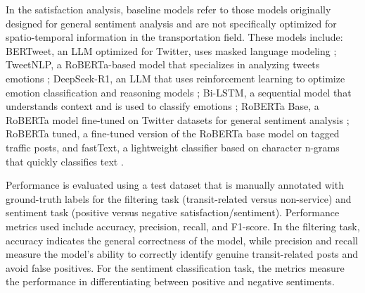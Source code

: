 \documentclass[a4paper,fleqn,12pt]{cas-sc}
\begin{document}
In the satisfaction analysis, baseline models refer to those models originally designed for general sentiment analysis and are not specifically optimized for spatio-temporal information in the transportation field. These models include: BERTweet, an LLM optimized for Twitter, uses masked language modeling \citep{nguyen2020bertweet}; TweetNLP, a RoBERTa-based model that specializes in analyzing tweets emotions \citep{camacho2022tweetnlp}; DeepSeek-R1, an LLM that uses reinforcement learning to optimize emotion classification and reasoning models \citep{guo2025deepseek}; Bi-LSTM, a sequential model that understands context and is used to classify emotions \citep{mahadevaswamy2023sentiment}; RoBERTa Base, a RoBERTa model fine-tuned on Twitter datasets for general sentiment analysis \citep{liu2019roberta}; RoBERTa tuned, a fine-tuned version of the RoBERTa base model on tagged traffic posts, and fastText, a lightweight classifier based on character n-grams that quickly classifies text \citep{joulin2017bag}.

Performance is evaluated using a test dataset that is manually annotated with ground-truth labels for the filtering task (transit-related versus non-service) and sentiment task (positive versus negative satisfaction/sentiment). Performance metrics used include accuracy, precision, recall, and F1-score. In the filtering task, accuracy indicates the general correctness of the model, while precision and recall measure the model's ability to correctly identify genuine transit-related posts and avoid false positives. For the sentiment classification task, the metrics measure the performance in differentiating between positive and negative sentiments.



\end{document}
